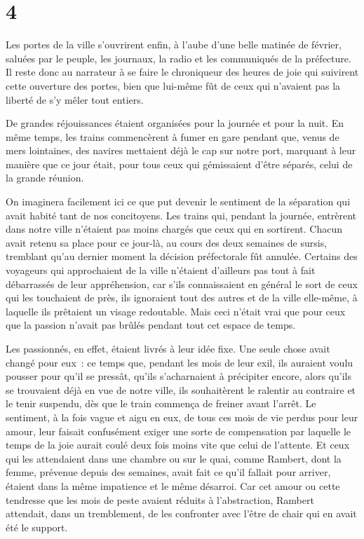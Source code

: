 \documentclass[french,twoside]{book} %
\begin{document}
\section[{4}]{4}
\noindent Les portes de la ville s’ouvrirent enfin, à l’aube d’une belle matinée de février, saluées par le peuple, les journaux, la radio et les communiqués de la préfecture. Il reste donc au narrateur à se faire le chroniqueur des heures de joie qui suivirent cette ouverture des portes, bien que lui-même fût de ceux qui n’avaient pas la liberté de s’y mêler tout entiers.\par
De grandes réjouissances étaient organisées pour la journée et pour la nuit. En même temps, les trains commencèrent à fumer en gare pendant que, venus de mers lointaines, des navires mettaient déjà le cap sur notre port, marquant à leur manière que ce jour était, pour tous ceux qui gémissaient d’être séparés, celui de la grande réunion.\par
On imaginera facilement ici ce que put devenir le sentiment de la séparation qui avait habité tant de nos concitoyens. Les trains qui, pendant la journée, entrèrent dans notre ville n’étaient pas moins chargés que ceux qui en sortirent. Chacun avait retenu sa place pour ce jour-là, au cours des deux semaines de sursis, tremblant qu’au dernier moment la décision préfectorale fût annulée. Certains des voyageurs qui approchaient de la ville n’étaient d’ailleurs pas tout à fait débarrassés de leur appréhension, car s’ils connaissaient en général le sort de ceux qui les touchaient de près, ils ignoraient tout des autres et de la ville elle-même, à laquelle ils prêtaient un visage redoutable. Mais ceci n’était vrai que pour ceux que la passion n’avait pas brûlés pendant tout cet espace de temps.\par
Les passionnés, en effet, étaient livrés à leur idée fixe. Une seule chose avait changé pour eux : ce temps que, pendant les mois de leur exil, ils auraient voulu pousser pour qu’il se pressât, qu’ils s’acharnaient à précipiter encore, alors qu’ils se trouvaient déjà en vue de notre ville, ils souhaitèrent le ralentir au contraire et le tenir suspendu, dès que le train commença de freiner avant l’arrêt. Le sentiment, à la fois vague et aigu en eux, de tous ces mois de vie perdus pour leur amour, leur faisait confusément exiger une sorte de compensation par laquelle le temps de la joie aurait coulé deux fois moins vite que celui de l’attente. Et ceux qui les attendaient dans une chambre ou sur le quai, comme Rambert, dont la femme, prévenue depuis des semaines, avait fait ce qu’il fallait pour arriver, étaient dans la même impatience et le même désarroi. Car cet amour ou cette tendresse que les mois de peste avaient réduits à l’abstraction, Rambert attendait, dans un tremblement, de les confronter avec l’être de chair qui en avait été le support.\par
\end{document}
